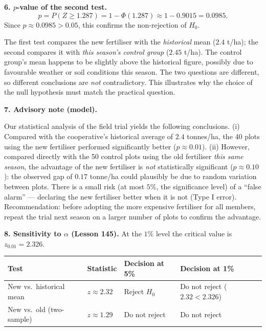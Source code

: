 \documentclass[11pt]{article}
\begin{document}
\textbf{6. $p$-value of the second test.}
\[ p = P(Z \geq 1.287) = 1 - \Phi(1.287) \approx 1 - 0.9015 = 0.0985. \]
Since $p \approx 0.0985 > 0.05$, this confirms the non-rejection of $H_0$.

\begin{attention}
The first test compares the new fertiliser with the \emph{historical} mean ($2.4$ t/ha); the second compares it with \emph{this season's control group} ($2.45$ t/ha). The control group's mean happens to be slightly above the historical figure, possibly due to favourable weather or soil conditions this season. The two questions are different, so different conclusions are \emph{not} contradictory. This illustrates why the choice of the null hypothesis must match the practical question.
\end{attention}

\textbf{7. Advisory note (model).}

\begin{aretenir}
Our statistical analysis of the field trial yields the following conclusions. (i) Compared with the cooperative's historical average of $2.4$ tonnes/ha, the 40 plots using the new fertiliser performed significantly better ($p \approx 0.01$). (ii) However, compared directly with the 50 control plots using the old fertiliser \emph{this same season}, the advantage of the new fertiliser is \emph{not} statistically significant ($p \approx 0.10$): the observed gap of $0.17$ tonne/ha could plausibly be due to random variation between plots. There is a small risk (at most $5\%$, the significance level) of a ``false alarm'' — declaring the new fertiliser better when it is not (Type I error). Recommendation: before adopting the more expensive fertiliser for all members, repeat the trial next season on a larger number of plots to confirm the advantage.
\end{aretenir}

\textbf{8. Sensitivity to $\alpha$ (Lesson 145).} At the $1\%$ level the critical value is $z_{0.01} = 2.326$.

\begin{center}
\begin{tabularx}{\linewidth}{|l|X|X|X|}
\hline
\rowcolor{popblueL} \textbf{Test} & \textbf{Statistic} & \textbf{Decision at 5\%} & \textbf{Decision at 1\%} \\
\hline
New vs.\ historical mean & $z \approx 2.32$ & Reject $H_0$ & Do not reject ($2.32 < 2.326$) \\
\hline
New vs.\ old (two-sample) & $z \approx 1.29$ & Do not reject & Do not reject \\
\hline
\end{tabularx}
\end{center}
\end{document}
